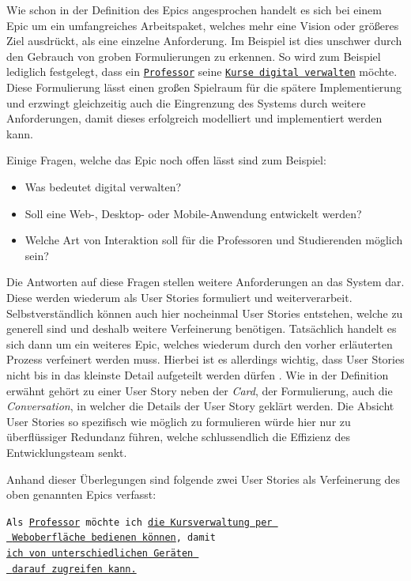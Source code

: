 \documentclass[acmtog]{acmart}
\begin{document}
Wie schon in der Definition des Epics angesprochen handelt es sich bei einem Epic um ein umfangreiches
Arbeitspaket, welches mehr eine Vision oder größeres Ziel ausdrückt, als eine einzelne Anforderung.
Im Beispiel ist dies unschwer durch den Gebrauch von groben Formulierungen zu erkennen. So wird zum
Beispiel lediglich festgelegt, dass ein \underline{\texttt{Professor}} seine \underline{\texttt{Kurse digital verwalten}}
möchte. Diese Formulierung lässt einen großen Spielraum für die spätere Implementierung und erzwingt gleichzeitig
auch die Eingrenzung des Systems durch weitere Anforderungen, damit dieses erfolgreich modelliert und implementiert werden kann.

Einige Fragen, welche das Epic noch offen lässt sind zum Beispiel:
\begin{itemize}
	\item Was bedeutet digital verwalten?
	\item Soll eine Web-, Desktop- oder Mobile-Anwendung entwickelt werden?
	\item Welche Art von Interaktion soll für die Professoren und Studierenden möglich sein?
\end{itemize}

Die Antworten auf diese Fragen stellen weitere Anforderungen an das System dar.
Diese werden wiederum als User Stories formuliert und weiterverarbeit.
Selbstverständlich können auch hier nocheinmal User Stories entstehen, welche
zu generell sind und deshalb weitere Verfeinerung benötigen.
Tatsächlich handelt es sich dann um ein weiteres Epic, welches wiederum durch den
vorher erläuterten Prozess verfeinert werden muss.
Hierbei ist es allerdings wichtig, dass User Stories nicht bis in das kleinste Detail
aufgeteilt werden dürfen \cite[p. 6]{cohn_user_2004}.
Wie in der Definition erwähnt gehört zu einer User Story neben der \emph{Card}, der Formulierung,
auch die \emph{Conversation}, in welcher die Details der User Story geklärt werden.
Die Absicht User Stories so spezifisch wie möglich zu formulieren würde hier nur zu überflüssiger
Redundanz führen, welche schlussendlich die Effizienz des Entwicklungsteam senkt.

Anhand dieser Überlegungen sind folgende zwei User Stories als Verfeinerung des oben genannten Epics verfasst:

\vspace{1em}
\texttt{Als \underline{Professor} möchte ich \underline{die Kursverwaltung per }\\
	\hspace*{2em} \underline{ Weboberfläche bedienen können}, damit\\
	\hspace*{6em} \underline{ich von unterschiedlichen Geräten }\\
	\hspace*{14em} \underline{ darauf zugreifen kann.}}
\vspace{1em}
\end{document}
